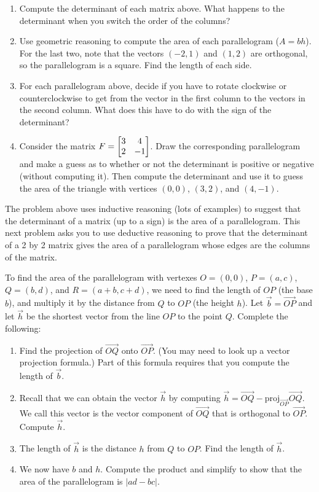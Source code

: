 \begin{problem}
\begin{enumerate}
\item Compute the determinant of each matrix above. What happens to the determinant when you switch the order of the columns? 
\item Use geometric reasoning to compute the area of each parallelogram ($A=bh$). For the last two, note that the vectors $(-2,1)$ and $(1,2)$ are orthogonal, so the parallelogram is a square. Find the length of each side. 
\item For each parallelogram above, decide if you have to rotate clockwise or counterclockwise to get from the vector in the first column to the vectors in the second column. What does this have to do with the sign of the determinant?
\item Consider the matrix $F=\begin{bmatrix}  \begin{matrix} 3\\2 \end{matrix}&\begin{matrix} 4\\-1 \end{matrix}  \end{bmatrix}$.  Draw the corresponding parallelogram and make a guess as to whether or not the determinant is positive or negative (without computing it). Then compute the determinant and use it to guess the area of the triangle with vertices $(0,0)$, $(3,2)$, and $(4,-1)$.
\end{enumerate}
\end{problem}

The problem above uses inductive reasoning (lots of examples) to suggest that the determinant of a matrix (up to a sign) is the area of a parallelogram. This next problem asks you to use deductive reasoning to prove that the determinant of a 2 by 2 matrix gives the area of a parallelogram whose edges are the columns of the matrix.
\begin{problem}
 To find the area of the parallelogram with vertexes $O=(0,0)$, $P=(a,c)$, $Q=(b,d)$, and $R=(a+b,c+d)$, we need to find the length of $OP$ (the base $b$), and multiply it by the distance from $Q$ to $OP$ (the height $h$). Let $\vec b = \vec{OP}$ and let $\vec h$ be the shortest vector from the line $OP$ to the point $Q$. Complete the following:
\begin{enumerate}
 \item Find the projection of $\vec {OQ}$ onto $\vec {OP}$. (You may need to look up a vector projection formula.) Part of this formula requires that you compute the length of $\vec b$.  
 \item Recall that we can obtain the vector $\vec h$ by computing $\vec h = \vec {OQ}-\text{proj}_{\vec{OP}}\vec{OQ}$. We call this vector is the vector component of $\vec {OQ}$ that is orthogonal to $\vec {OP}$. Compute $\vec h$.
 \item The length of $\vec h$ is the distance $h$ from $Q$ to $OP$. Find the length of $\vec h$.
 \item We now have $b$ and $h$. Compute the product and simplify to show that the area of the parallelogram is $|ad-bc|$.
\end{enumerate}
\end{problem}


